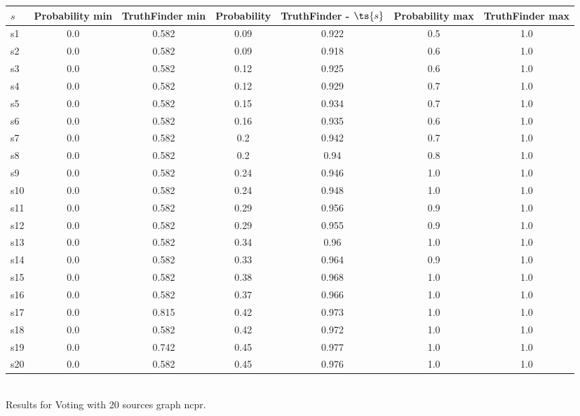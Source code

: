 \documentclass{article}
\begin{document}
\noindent\begin{tabular}{|l|c|c|c|c|c|c|}
\hline
$s$& Probability min & TruthFinder min & Probability & TruthFinder - $\ts{s}$ & Probability max & TruthFinder max\\
\hline
s1 &0.0 & 0.582 & 0.09 & 0.922 & 0.5 & 1.0\\
\hline
s2 &0.0 & 0.582 & 0.09 & 0.918 & 0.6 & 1.0\\
\hline
s3 &0.0 & 0.582 & 0.12 & 0.925 & 0.6 & 1.0\\
\hline
s4 &0.0 & 0.582 & 0.12 & 0.929 & 0.7 & 1.0\\
\hline
s5 &0.0 & 0.582 & 0.15 & 0.934 & 0.7 & 1.0\\
\hline
s6 &0.0 & 0.582 & 0.16 & 0.935 & 0.6 & 1.0\\
\hline
s7 &0.0 & 0.582 & 0.2 & 0.942 & 0.7 & 1.0\\
\hline
s8 &0.0 & 0.582 & 0.2 & 0.94 & 0.8 & 1.0\\
\hline
s9 &0.0 & 0.582 & 0.24 & 0.946 & 1.0 & 1.0\\
\hline
s10 &0.0 & 0.582 & 0.24 & 0.948 & 1.0 & 1.0\\
\hline
s11 &0.0 & 0.582 & 0.29 & 0.956 & 0.9 & 1.0\\
\hline
s12 &0.0 & 0.582 & 0.29 & 0.955 & 0.9 & 1.0\\
\hline
s13 &0.0 & 0.582 & 0.34 & 0.96 & 1.0 & 1.0\\
\hline
s14 &0.0 & 0.582 & 0.33 & 0.964 & 0.9 & 1.0\\
\hline
s15 &0.0 & 0.582 & 0.38 & 0.968 & 1.0 & 1.0\\
\hline
s16 &0.0 & 0.582 & 0.37 & 0.966 & 1.0 & 1.0\\
\hline
s17 &0.0 & 0.815 & 0.42 & 0.973 & 1.0 & 1.0\\
\hline
s18 &0.0 & 0.582 & 0.42 & 0.972 & 1.0 & 1.0\\
\hline
s19 &0.0 & 0.742 & 0.45 & 0.977 & 1.0 & 1.0\\
\hline
s20 &0.0 & 0.582 & 0.45 & 0.976 & 1.0 & 1.0\\
\hline
\end{tabular}\\

\noindent Results for Voting with 20 sources graph ncpr.
\end{document}

